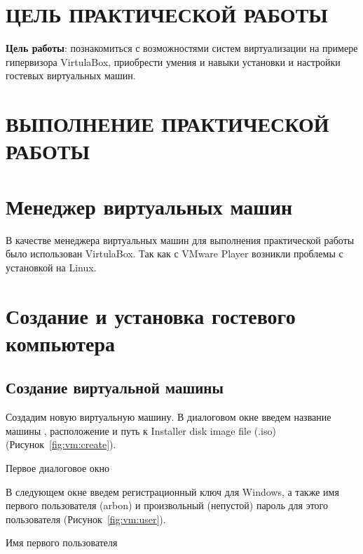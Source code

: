 \section*{ЦЕЛЬ ПРАКТИЧЕСКОЙ РАБОТЫ}

\textbf{Цель работы}: познакомиться с возможностями систем виртуализации
на примере гипервизора VirtulaBox,
приобрести умения и навыки установки и настройки гостевых виртуальных машин.

\clearpage

\section*{ВЫПОЛНЕНИЕ ПРАКТИЧЕСКОЙ РАБОТЫ}

\section{Менеджер виртуальных машин}

В качестве менеджера виртуальных машин для выполнения практической работы
было использован VirtulaBox. Так как с VMware Player возникли проблемы
с установкой на Linux.

\clearpage

\section{Создание и установка гостевого компьютера}

\subsection{Создание виртуальной машины}

Создадим новую виртуальную машину.
В диалоговом окне введем название машины
, расположение и путь к Installer disk image file (.iso)
(Рисунок~\ref{fig:vm:create}).

\begin{image}
	\caption{Первое диалоговое окно}
	\label{fig:vm:create}
\end{image}

В следующем окне введем регистрационный ключ для Windows, а также имя
первого пользователя (arbon) и произвольный (непустой) пароль
для этого пользователя (Рисунок~\ref{fig:vm:user}).

\begin{image}
	\caption{Имя первого пользователя}
	\label{fig:vm:user}
\end{image}

